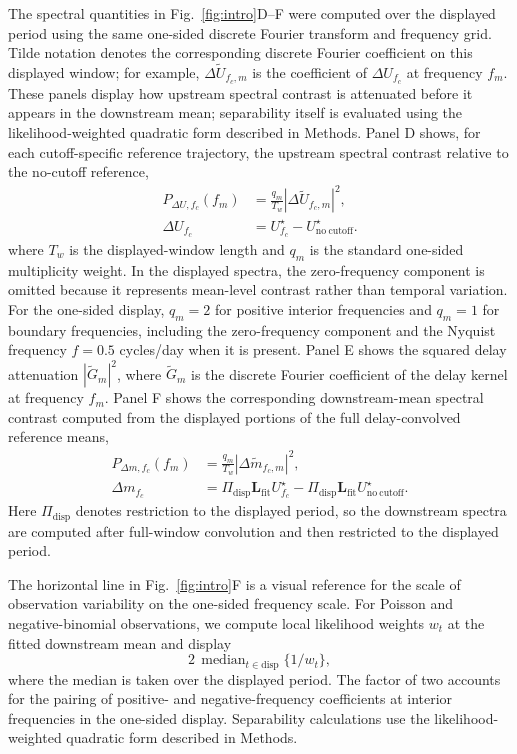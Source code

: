 The spectral quantities in Fig.~\ref{fig:intro}D--F were computed over the displayed period using the same one-sided discrete Fourier transform and frequency grid. Tilde notation denotes the corresponding discrete Fourier coefficient on this displayed window; for example, \(\Delta\widetilde U_{f_c,m}\) is the coefficient of \(\Delta U_{f_c}\) at frequency \(f_m\). These panels display how upstream spectral contrast is attenuated before it appears in the downstream mean; separability itself is evaluated using the likelihood-weighted quadratic form described in Methods. Panel D shows, for each cutoff-specific reference trajectory, the upstream spectral contrast relative to the no-cutoff reference,
\[
\begin{aligned}
P_{\Delta U,f_c}(f_m)
&=
\frac{q_m}{T_w}
\left|
\Delta\widetilde U_{f_c,m}
\right|^2,\\
\Delta U_{f_c}
&=
U^\star_{f_c}-U^\star_{\mathrm{no\ cutoff}}.
\end{aligned}
\]
where \(T_w\) is the displayed-window length and \(q_m\) is the standard one-sided multiplicity weight. In the displayed spectra, the zero-frequency component is omitted because it represents mean-level contrast rather than temporal variation. For the one-sided display, \(q_m=2\) for positive interior frequencies and \(q_m=1\) for boundary frequencies, including the zero-frequency component and the Nyquist frequency \(f=0.5\) cycles/day when it is present. Panel E shows the squared delay attenuation \(|\widetilde G_m|^2\), where \(\widetilde G_m\) is the discrete Fourier coefficient of the delay kernel at frequency \(f_m\). Panel F shows the corresponding downstream-mean spectral contrast computed from the displayed portions of the full delay-convolved reference means,
\[
\begin{aligned}
P_{\Delta m,f_c}(f_m)
&=
\frac{q_m}{T_w}
\left|
\Delta\widetilde m_{f_c,m}
\right|^2,\\
\Delta m_{f_c}
&=
\Pi_{\mathrm{disp}}\mathbf L_{\mathrm{fit}} U^\star_{f_c}
-
\Pi_{\mathrm{disp}}\mathbf L_{\mathrm{fit}} U^\star_{\mathrm{no\ cutoff}}.
\end{aligned}
\]
Here \(\Pi_{\mathrm{disp}}\) denotes restriction to the displayed period, so the downstream spectra are computed after full-window convolution and then restricted to the displayed period.

The horizontal line in Fig.~\ref{fig:intro}F is a visual reference for the scale of observation variability on the one-sided frequency scale. For Poisson and negative-binomial observations, we compute local likelihood weights \(w_t\) at the fitted downstream mean and display
\[
2\,\operatorname{median}_{t\in \mathrm{disp}}\{1/w_t\},
\]
where the median is taken over the displayed period. The factor of two accounts for the pairing of positive- and negative-frequency coefficients at interior frequencies in the one-sided display. Separability calculations use the likelihood-weighted quadratic form described in Methods.
